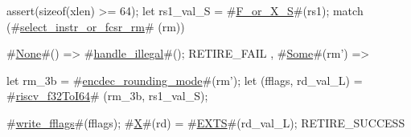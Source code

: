 assert(sizeof(xlen) >= 64);
let rs1_val_S = #\hyperref[sailRISCVzFzyorzyXzyS]{F\_or\_X\_S}#(rs1);
match (#\hyperref[sailRISCVzselectzyinstrzyorzyfcsrzyrm]{select\_instr\_or\_fcsr\_rm}# (rm)) {
  #\hyperref[sailRISCVzNone]{None}#() => { #\hyperref[sailRISCVzhandlezyillegal]{handle\_illegal}#(); RETIRE_FAIL },
  #\hyperref[sailRISCVzSome]{Some}#(rm') => {
    let rm_3b = #\hyperref[sailRISCVzencdeczyroundingzymode]{encdec\_rounding\_mode}#(rm');
    let (fflags, rd_val_L) = #\hyperref[sailRISCVzriscvzyf32ToI64]{riscv\_f32ToI64}# (rm_3b, rs1_val_S);

    #\hyperref[sailRISCVzwritezyfflags]{write\_fflags}#(fflags);
    #\hyperref[sailRISCVzX]{X}#(rd) = #\hyperref[sailRISCVzEXTS]{EXTS}#(rd_val_L);
    RETIRE_SUCCESS
  }
}
